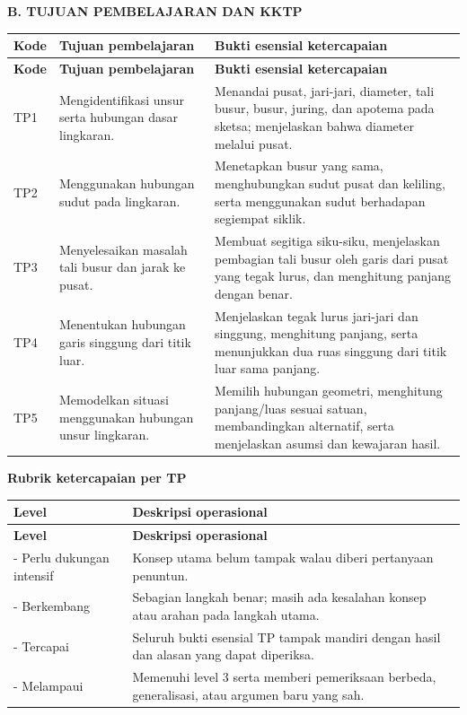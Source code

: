 \documentclass[11pt,a4paper]{article}
\begin{document}
\clearpage
\begin{center}\bfseries\large B. TUJUAN PEMBELAJARAN DAN KKTP\end{center}\medskip
{\small\setlength{\tabcolsep}{2mm}\renewcommand{\arraystretch}{1.35}\begin{longtable}{|>{\raggedright\arraybackslash}p{16.269mm}|>{\raggedright\arraybackslash}p{67.787mm}|>{\raggedright\arraybackslash}p{81.344mm}|}\hline
\rowcolor{gray!10}\textbf{Kode} & \textbf{Tujuan pembelajaran} & \textbf{Bukti esensial ketercapaian}\\ \hline
\endfirsthead
\rowcolor{gray!10}\textbf{Kode} & \textbf{Tujuan pembelajaran} & \textbf{Bukti esensial ketercapaian}\\ \hline
\endhead
TP1 & Mengidentifikasi unsur serta hubungan dasar lingkaran. & Menandai pusat, jari-jari, diameter, tali busur, busur, juring, dan apotema pada sketsa; menjelaskan bahwa diameter melalui pusat.\\ \hline
TP2 & Menggunakan hubungan sudut pada lingkaran. & Menetapkan busur yang sama, menghubungkan sudut pusat dan keliling, serta menggunakan sudut berhadapan segiempat siklik.\\ \hline
TP3 & Menyelesaikan masalah tali busur dan jarak ke pusat. & Membuat segitiga siku-siku, menjelaskan pembagian tali busur oleh garis dari pusat yang tegak lurus, dan menghitung panjang dengan benar.\\ \hline
TP4 & Menentukan hubungan garis singgung dari titik luar. & Menjelaskan tegak lurus jari-jari dan singgung, menghitung panjang, serta menunjukkan dua ruas singgung dari titik luar sama panjang.\\ \hline
TP5 & Memodelkan situasi menggunakan hubungan unsur lingkaran. & Memilih hubungan geometri, menghitung panjang/luas sesuai satuan, membandingkan alternatif, serta menjelaskan asumsi dan kewajaran hasil.\\ \hline
\end{longtable}}\medskip
\par\medskip\noindent\textbf{Rubrik ketercapaian per TP}\par\smallskip
{\small\setlength{\tabcolsep}{2mm}\renewcommand{\arraystretch}{1.35}\begin{longtable}{|>{\raggedright\arraybackslash}p{41.693mm}|>{\raggedright\arraybackslash}p{127.857mm}|}\hline
\rowcolor{gray!10}\textbf{Level} & \textbf{Deskripsi operasional}\\ \hline
\endfirsthead
\rowcolor{gray!10}\textbf{Level} & \textbf{Deskripsi operasional}\\ \hline
\endhead
1 - Perlu dukungan intensif & Konsep utama belum tampak walau diberi pertanyaan penuntun.\\ \hline
2 - Berkembang & Sebagian langkah benar; masih ada kesalahan konsep atau arahan pada langkah utama.\\ \hline
3 - Tercapai & Seluruh bukti esensial TP tampak mandiri dengan hasil dan alasan yang dapat diperiksa.\\ \hline
4 - Melampaui & Memenuhi level 3 serta memberi pemeriksaan berbeda, generalisasi, atau argumen baru yang sah.\\ \hline
\end{longtable}}\medskip
\end{document}
